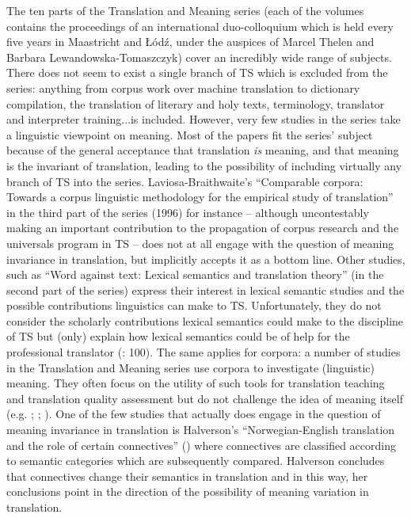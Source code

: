 The ten parts of the Translation and Meaning series (each of the volumes contains the proceedings of an international duo-colloquium which is held every five years in Maastricht and Łódź, under the auspices of Marcel Thelen and Barbara Lewandowska-Tomaszczyk) cover an incredibly wide range of subjects. There does not seem to exist a single branch of TS which is excluded from the series: anything from corpus work over machine translation to dictionary compilation, the translation of literary and holy texts, terminology, translator and interpreter training...is included. However, very few studies in the series take a linguistic viewpoint on meaning. Most of the papers fit the series’ subject because of the general acceptance that translation \textit{is} meaning, and that meaning is the invariant of translation, leading to the possibility of including virtually any branch of TS into the series. Laviosa-Braithwaite’s “Comparable corpora: Towards a corpus linguistic methodology for the empirical study of translation” in the third part of the series (1996) for instance – although uncontestably making an important contribution to the propagation of corpus research and the universals program in TS – does not at all engage with the question of meaning invariance in translation, but implicitly accepts it as a bottom line. Other studies, such as   “Word against text: Lexical semantics and translation theory” (in the second part of the series) express their interest in lexical semantic studies and the possible contributions linguistics can make to TS. Unfortunately, they do not consider the scholarly contributions lexical semantics could make to the discipline of TS but (only) explain how lexical semantics could be of help for the professional translator (\citealt{lewandowska-tomasczyk_specification_2010}: 100). The same applies for corpora: a number of studies in the Translation and Meaning series use corpora to investigate (linguistic) meaning. They often focus on the utility of such tools for translation teaching and translation quality assessment but do not challenge the idea of meaning itself (e.g. \citealt{thelen_equivalence_1997}; \citealt{thelen_corpus-based_2007};  \citealt{thelen_semantic_2008}). One of the few studies that actually does engage in the question of meaning invariance in translation is Halverson’s “Norwegian-English translation and the role of certain connectives” (\citeyear{thelen_norwegian-english_1996}) where connectives are classified according to semantic categories which are subsequently compared. Halverson concludes that connectives change their semantics in translation and in this way, her conclusions point in the direction of the possibility of meaning variation in translation.


